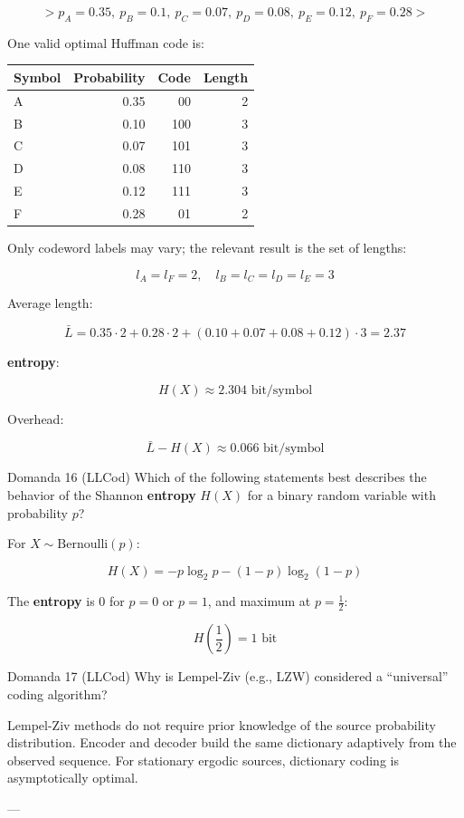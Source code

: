 $$
> p_A=0.35,\ p_B=0.1,\ p_C=0.07,\ p_D=0.08,\ p_E=0.12,\ p_F=0.28
> $$


One valid optimal Huffman code is:


\begin{center}
\begin{tabular}{ | l | r | r | r | }
\hline
\textbf{Symbol} & \textbf{Probability} & \textbf{Code} & \textbf{Length} \\
\hline
A & 0.35 & 00 & 2 \\
\hline
B & 0.10 & 100 & 3 \\
\hline
C & 0.07 & 101 & 3 \\
\hline
D & 0.08 & 110 & 3 \\
\hline
E & 0.12 & 111 & 3 \\
\hline
F & 0.28 & 01 & 2 \\
\hline
\end{tabular}
\end{center}
Only codeword labels may vary; the relevant result is the set of lengths:


$$
l_A=l_F=2,\quad l_B=l_C=l_D=l_E=3
$$


Average length:


$$
\bar{L}=0.35\cdot2+0.28\cdot2+(0.10+0.07+0.08+0.12)\cdot3=2.37
$$


\textbf{entropy}:


$$
H(X)\approx 2.304 \text{ bit/symbol}
$$


Overhead:


$$
\bar{L}-H(X)\approx 0.066 \text{ bit/symbol}
$$




\begin{questionbox}{Domanda 16}
(LLCod) Which of the following statements best describes the behavior of the Shannon \textbf{entropy} $H(X)$ for a binary random variable with probability $p$?
\end{questionbox}


For $X\sim\text{Bernoulli}(p)$:


$$
H(X)=-p\log_2 p -(1-p)\log_2(1-p)
$$


The \textbf{entropy} is $0$ for $p=0$ or $p=1$, and maximum at $p=\frac{1}{2}$:


$$
H\left(\frac{1}{2}\right)=1 \text{ bit}
$$




\begin{questionbox}{Domanda 17}
(LLCod) Why is Lempel-Ziv (e.g., LZW) considered a “universal” coding algorithm?
\end{questionbox}


Lempel-Ziv methods do not require prior knowledge of the source probability distribution. Encoder and decoder build the same dictionary adaptively from the observed sequence. For stationary ergodic sources, dictionary coding is asymptotically optimal.

---



